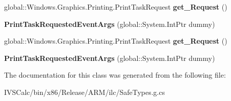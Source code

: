 \begin{DoxyCompactItemize}
\mbox{\label{class_windows_1_1_graphics_1_1_printing_1_1_print_task_requested_event_args_a32fa25b3ad77891f1a4e5d932b5ff097}} 
global\+::\+Windows.\+Graphics.\+Printing.\+Print\+Task\+Request {\bfseries get\+\_\+\+Request} ()
\item 
\mbox{\label{class_windows_1_1_graphics_1_1_printing_1_1_print_task_requested_event_args_affb83e7e22bbcabbd1acbd58b1f1da99}} 
{\bfseries Print\+Task\+Requested\+Event\+Args} (global\+::\+System.\+Int\+Ptr dummy)
\item 
\mbox{\label{class_windows_1_1_graphics_1_1_printing_1_1_print_task_requested_event_args_a32fa25b3ad77891f1a4e5d932b5ff097}} 
global\+::\+Windows.\+Graphics.\+Printing.\+Print\+Task\+Request {\bfseries get\+\_\+\+Request} ()
\item 
\mbox{\label{class_windows_1_1_graphics_1_1_printing_1_1_print_task_requested_event_args_affb83e7e22bbcabbd1acbd58b1f1da99}} 
{\bfseries Print\+Task\+Requested\+Event\+Args} (global\+::\+System.\+Int\+Ptr dummy)
\end{DoxyCompactItemize}


The documentation for this class was generated from the following file\+:\begin{DoxyCompactItemize}
\item 
I\+V\+S\+Calc/bin/x86/\+Release/\+A\+R\+M/ilc/Safe\+Types.\+g.\+cs\end{DoxyCompactItemize}
